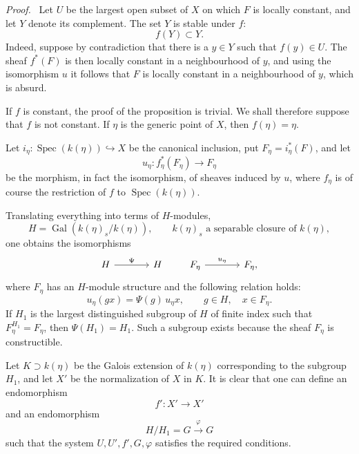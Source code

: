 \documentclass[11pt]{article}
\newenvironment{prooftext}[1][Proof]{\par\noindent\emph{#1.}\ }{\par\medskip}
\DeclareMathOperator{\Spec}{Spec}
\providecommand{\Gal}{\operatorname{Gal}}
\providecommand{\Spec}{\operatorname{Spec}}
\providecommand{\Spec}{\operatorname{Spec}}
\providecommand{\Spec}{\operatorname{Spec}}
\providecommand{\Spec}{\operatorname{Spec}}
\providecommand{\Gal}{\operatorname{Gal}}
\begin{document}
\begin{prooftext}[Proof]
Let $U$ be the largest open subset of $X$ on which $F$ is locally constant, and let $Y$ denote its complement. The set $Y$ is stable under $f$:
\[
f(Y)\subset Y.
\]
Indeed, suppose by contradiction that there is a $y\in Y$ such that $f(y)\in U$. The sheaf $f^*(F)$ is then locally constant in a neighbourhood of $y$, and using the isomorphism $u$ it follows that $F$ is locally constant in a neighbourhood of $y$, which is absurd.

If $f$ is constant, the proof of the proposition is trivial. We shall therefore suppose that $f$ is not constant. If $\eta$ is the generic point of $X$, then $f(\eta)=\eta$.

Let $i_\eta:\Spec(k(\eta))\hookrightarrow X$ be the canonical inclusion, put $F_\eta=i_\eta^*(F)$, and let
\[
u_\eta:f_\eta^*(F_\eta)\longrightarrow F_\eta
\]
be the morphism, in fact the isomorphism, of sheaves induced by $u$, where $f_\eta$ is of course the restriction of $f$ to $\Spec(k(\eta))$.

Translating everything into terms of $H$-modules,
\[
H=\Gal(k(\eta)_s/k(\eta)),\qquad k(\eta)_s\text{ a separable closure of }k(\eta),
\]
one obtains the isomorphisms
\[
\begin{tikzcd}[column sep=large]
H \arrow[r,"\Psi"] & H
\end{tikzcd}
\qquad
\begin{tikzcd}[column sep=large]
F_\eta \arrow[r,"u_\eta"] & F_\eta,
\end{tikzcd}
\]
where $F_\eta$ has an $H$-module structure and the following relation holds:
\[
u_\eta(gx)=\Psi(g)\,u_\eta x,
\qquad g\in H,
\quad x\in F_\eta.
\]
If $H_1$ is the largest distinguished subgroup of $H$ of finite index such that $F_\eta^{H_1}=F_\eta$, then $\Psi(H_1)=H_1$. Such a subgroup exists because the sheaf $F_\eta$ is constructible.

Let $K\supset k(\eta)$ be the Galois extension of $k(\eta)$ corresponding to the subgroup $H_1$, and let $X'$ be the normalization of $X$ in $K$. It is clear that one can define an endomorphism
\[
f':X'\longrightarrow X'
\]
and an endomorphism
\[
H/H_1=G\xrightarrow{\varphi}G
\]
such that the system $U,U',f',G,\varphi$ satisfies the required conditions.
\end{prooftext}
\end{document}
